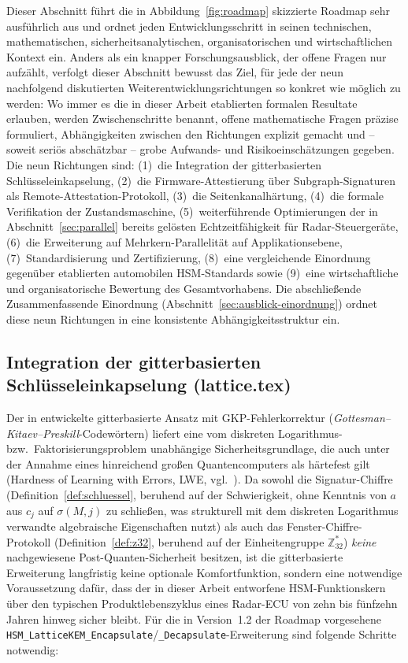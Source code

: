 ﻿\documentclass[a4paper,12pt]{article}
\theoremstyle{definition}
\begin{document}
Dieser Abschnitt führt die in Abbildung~\ref{fig:roadmap} skizzierte Roadmap sehr ausführlich aus und ordnet jeden Entwicklungsschritt in seinen technischen, mathematischen, sicherheitsanalytischen, organisatorischen und wirtschaftlichen Kontext ein. Anders als ein knapper Forschungsausblick, der offene Fragen nur aufzählt, verfolgt dieser Abschnitt bewusst das Ziel, für jede der neun nachfolgend diskutierten Weiterentwicklungsrichtungen so konkret wie möglich zu werden: Wo immer es die in dieser Arbeit etablierten formalen Resultate erlauben, werden Zwischenschritte benannt, offene mathematische Fragen präzise formuliert, Abhängigkeiten zwischen den Richtungen explizit gemacht und -- soweit seriös abschätzbar -- grobe Aufwands- und Risikoeinschätzungen gegeben. Die neun Richtungen sind: (1)~die Integration der gitterbasierten Schlüsseleinkapselung, (2)~die Firmware-Attestierung über Subgraph-Signaturen als Remote-Attestation-Protokoll, (3)~die Seitenkanalhärtung, (4)~die formale Verifikation der Zustandsmaschine, (5)~weiterführende Optimierungen der in Abschnitt~\ref{sec:parallel} bereits gelösten Echtzeitfähigkeit für Radar-Steuergeräte, (6)~die Erweiterung auf Mehrkern-Parallelität auf Applikationsebene, (7)~Standardisierung und Zertifizierung, (8)~eine vergleichende Einordnung gegenüber etablierten automobilen HSM-Standards sowie (9)~eine wirtschaftliche und organisatorische Bewertung des Gesamtvorhabens. Die abschließende Zusammenfassende Einordnung (Abschnitt~\ref{sec:ausblick-einordnung}) ordnet diese neun Richtungen in eine konsistente Abhängigkeitsstruktur ein.

\subsection{Integration der gitterbasierten Schlüsseleinkapselung (lattice.tex)}

Der in \cite{Epp26d} entwickelte gitterbasierte Ansatz mit GKP-Fehlerkorrektur (\emph{Gottesman--Kitaev--Preskill}-Codewörtern) liefert eine vom diskreten Logarithmus- bzw.\ Faktorisierungsproblem unabhängige Sicherheitsgrundlage, die auch unter der Annahme eines hinreichend großen Quantencomputers als härtefest gilt (Hardness of Learning with Errors, LWE, vgl.\ \cite{Regev09}). Da sowohl die Signatur-Chiffre (Definition~\ref{def:schluessel}, beruhend auf der Schwierigkeit, ohne Kenntnis von $a$ aus $c_j$ auf $\sigma(M,j)$ zu schließen, was strukturell mit dem diskreten Logarithmus verwandte algebraische Eigenschaften nutzt) als auch das Fenster-Chiffre-Protokoll (Definition~\ref{def:z32}, beruhend auf der Einheitengruppe $\mathbb{Z}_{32}^*$) \emph{keine} nachgewiesene Post-Quanten-Sicherheit besitzen, ist die gitterbasierte Erweiterung langfristig keine optionale Komfortfunktion, sondern eine notwendige Voraussetzung dafür, dass der in dieser Arbeit entworfene HSM-Funktionskern über den typischen Produktlebenszyklus eines Radar-ECU von zehn bis fünfzehn Jahren hinweg sicher bleibt. Für die in Version~1.2 der Roadmap vorgesehene \texttt{HSM\_LatticeKEM\_Encapsulate}/\texttt{\_Decapsulate}-Erweiterung sind folgende Schritte notwendig:
\end{document}
